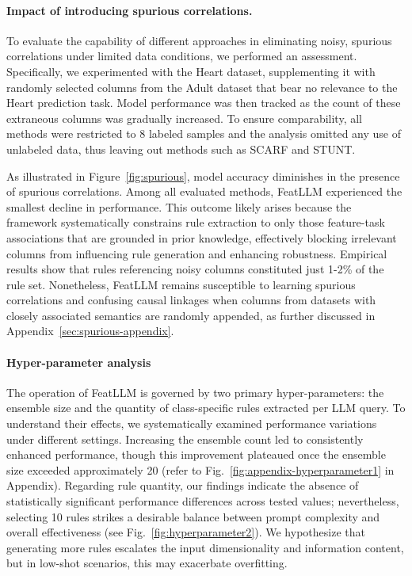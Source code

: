 \vspace*{-0.12in}
\paragraph{Impact of introducing spurious correlations.} To evaluate the capability of different approaches in eliminating noisy, spurious correlations under limited data conditions, we performed an assessment. Specifically, we experimented with the Heart dataset, supplementing it with randomly selected columns from the Adult dataset that bear no relevance to the Heart prediction task. Model performance was then tracked as the count of these extraneous columns was gradually increased. To ensure comparability, all methods were restricted to 8 labeled samples and the analysis omitted any use of unlabeled data, thus leaving out methods such as SCARF and STUNT.

As illustrated in Figure~\ref{fig:spurious}, model accuracy diminishes in the presence of spurious correlations. Among all evaluated methods, \textsf{FeatLLM} experienced the smallest decline in performance. This outcome likely arises because the framework systematically constrains rule extraction to only those feature-task associations that are grounded in prior knowledge, effectively blocking irrelevant columns from influencing rule generation and enhancing robustness. Empirical results show that rules referencing noisy columns constituted just 1-2\% of the rule set. Nonetheless, \textsf{FeatLLM} remains susceptible to learning spurious correlations and confusing causal linkages when columns from datasets with closely associated semantics are randomly appended, as further discussed in Appendix~\ref{sec:spurious-appendix}.

\vspace*{-0.12in}
\paragraph{Hyper-parameter analysis}
The operation of \textsf{FeatLLM} is governed by two primary hyper-parameters: the ensemble size and the quantity of class-specific rules extracted per LLM query. To understand their effects, we systematically examined performance variations under different settings. Increasing the ensemble count led to consistently enhanced performance, though this improvement plateaued once the ensemble size exceeded approximately 20 (refer to Fig.~\ref{fig:appendix-hyperparameter1} in Appendix). Regarding rule quantity, our findings indicate the absence of statistically significant performance differences across tested values; nevertheless, selecting 10 rules strikes a desirable balance between prompt complexity and overall effectiveness (see Fig.~\ref{fig:hyperparameter2}). We hypothesize that generating more rules escalates the input dimensionality and information content, but in low-shot scenarios, this may exacerbate overfitting.

